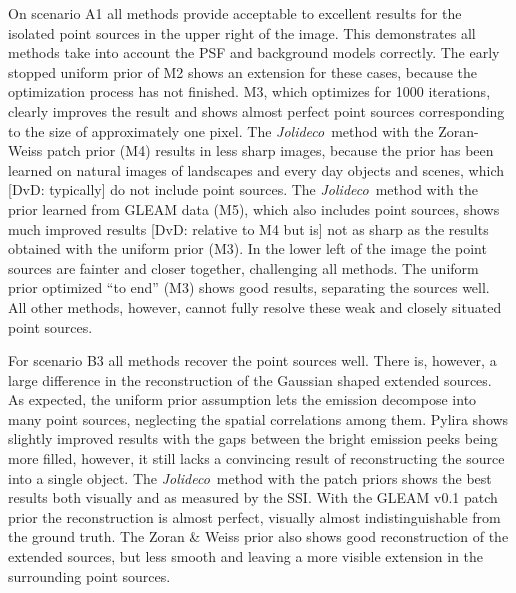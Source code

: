 \documentclass[twocolumn]{aastex631}
\newcommand{\jolideco}{\textit{Jolideco}~}
\newcommand{\dvd}[1]{{\color{red} [DvD: #1]}}
\begin{document}
    On scenario A1 all methods provide acceptable to excellent results for the isolated point sources in the upper right of the image. This demonstrates all methods take into account the PSF and background models correctly. The early stopped uniform prior of M2 shows an extension for these cases, because the optimization process has not finished. M3, which optimizes for 1000 iterations, clearly improves the result and shows almost perfect point sources corresponding to the size of approximately one pixel. The \jolideco method with the Zoran-Weiss  patch prior (M4) results in less sharp images, because the prior has been learned on natural images of landscapes and every day objects and scenes, which \dvd{typically} do not include point sources. The \jolideco method with the prior learned from GLEAM data (M5), which also includes point sources, shows much improved results \dvd{relative to M4 but is} 
    not as sharp as the results obtained with the uniform prior (M3). In the lower left of the image the point sources are fainter and closer together, challenging all methods.%
    The uniform prior optimized \enquote{to end} (M3) shows good results, separating the sources well. All other methods, however, cannot fully resolve these weak and closely situated point sources.


    
    For scenario B3 all methods recover the point sources well.  There is, however, a large difference  in the reconstruction of the Gaussian shaped extended sources. As expected, the uniform prior assumption lets the emission decompose into many point sources, neglecting the spatial correlations among them. Pylira shows slightly improved results with the gaps between the bright emission peeks being more filled, however, it still lacks a convincing result of reconstructing the source into a single object. The \jolideco method with the patch priors shows the best results both visually and as measured by the SSI. With the GLEAM v0.1 patch prior the reconstruction is almost perfect, visually almost indistinguishable from the ground truth. The Zoran \& Weiss prior also shows good reconstruction of the extended sources, but less smooth and leaving a more visible extension in the surrounding point sources.
 
\end{document}
